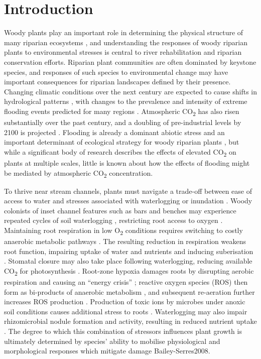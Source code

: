 \documentclass[openright,12pt,a4paper]{memoir}
\begin{document}
\clearpage

\section{Introduction}
Woody plants play an important role in determining the physical structure of many riparian ecosystems \citep{Lawson2015}, and understanding the responses of woody riparian plants to environmental stresses is central to river rehabilitation and riparian conservation efforts. Riparian plant communities are often dominated by keystone species, and responses of such species to environmental change may have important consequences for riparian landscapes defined by their presence. Changing climatic conditions over the next century are expected to cause shifts in hydrological patterns \citep{stocker2013climate}, with changes to the prevalence and intensity of extreme flooding events predicted for many regions \citep{Hennessy2008}. Atmospheric CO\textsubscript{2} has also risen substantially over the past century, and a doubling of pre-industrial levels by 2100 is projected \citep{IPCC2014}. Flooding is already a dominant abiotic stress and an important determinant of ecological strategy for woody riparian plants \citep{Blom1996,Lawson2015}, but while a significant body of research describes the effects of elevated CO\textsubscript{2} on plants at multiple scales, little is known about how the effects of flooding might be mediated by atmospheric CO\textsubscript{2} concentration.

To thrive near stream channels, plants must navigate a trade-off between ease of access to water and stresses associated with waterlogging or inundation \citep{Naiman1993, Colmer2009}. Woody colonists of inset channel features such as bars and benches may experience repeated cycles of soil waterlogging \citep{Corenblit2009}, restricting root access to oxygen \citep{Voesenek2015}. Maintaining root respiration in low O\textsubscript{2} conditions requires switching to costly anaerobic metabolic pathways \citep{Drew1997}. The resulting reduction in respiration weakens root function, impairing uptake of water and nutrients \citep{Piedade2010, Voesenek2015} and inducing suberisation \citep{Steudle2000}. Stomatal closure may also take place following waterlogging, reducing available CO\textsubscript{2} for photosynthesis \citep{Kozlowski1984, Else2009}. Root-zone hypoxia damages roots by disrupting aerobic respiration and causing an “energy crisis” \citep{Colmer2009}; reactive oxygen species (ROS) then form as bi-products of anaerobic metabolism \citep{Santosa2007}, and  subsequent re-aeration further increases ROS production \citep{Steffens2013}. Production of toxic ions by microbes under anoxic soil conditions causes additional stress to roots \citep{Blom1996}. Waterlogging may also impair rhizomicrobial nodule formation and activity, resulting in reduced nutrient uptake \citep{Dawson1989, Shimono2012}. The degree to which this combination of stressors influences plant growth is ultimately determined by species’ ability to mobilise physiological and morphological responses which mitigate damage {Bailey-Serres2008}.
  
\end{document}
